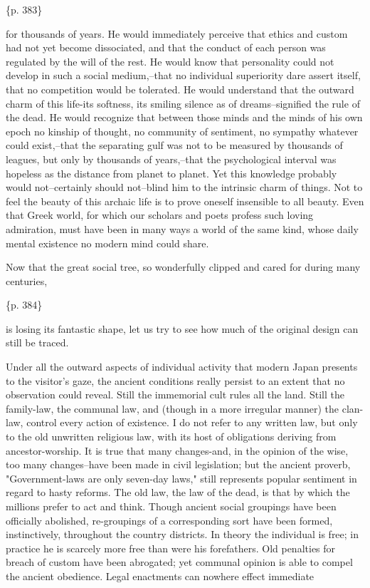 \{p. 383\}

for thousands of years. He would immediately perceive that ethics and custom had not yet become dissociated, and that the conduct of each person was regulated by the will of the rest. He would know that personality could not develop in such a social medium,--that no individual superiority dare assert itself, that no competition would be tolerated. He would understand that the outward charm of this life-its softness, its smiling silence as of dreams--signified the rule of the dead. He would recognize that between those minds and the minds of his own epoch no kinship of thought, no community of sentiment, no sympathy whatever could exist,--that the separating gulf was not to be measured by thousands of leagues, but only by thousands of years,--that the psychological interval was hopeless as the distance from planet to planet. Yet this knowledge probably would not--certainly should not--blind him to the intrinsic charm of things. Not to feel the beauty of this archaic life is to prove oneself insensible to all beauty. Even that Greek world, for which our scholars and poets profess such loving admiration, must have been in many ways a world of the same kind, whose daily mental existence no modern mind could share.



Now that the great social tree, so wonderfully clipped and cared for during many centuries,

\{p. 384\}

is losing its fantastic shape, let us try to see how much of the original design can still be traced.

Under all the outward aspects of individual activity that modern Japan presents to the visitor's gaze, the ancient conditions really persist to an extent that no observation could reveal. Still the immemorial cult rules all the land. Still the family-law, the communal law, and (though in a more irregular manner) the clan-law, control every action of existence. I do not refer to any written law, but only to the old unwritten religious law, with its host of obligations deriving from ancestor-worship. It is true that many changes-and, in the opinion of the wise, too many changes--have been made in civil legislation; but the ancient proverb, "Government-laws are only seven-day laws," still represents popular sentiment in regard to hasty reforms. The old law, the law of the dead, is that by which the millions prefer to act and think. Though ancient social groupings have been officially abolished, re-groupings of a corresponding sort have been formed, instinctively, throughout the country districts. In theory the individual is free; in practice he is scarcely more free than were his forefathers. Old penalties for breach of custom have been abrogated; yet communal opinion is able to compel the ancient obedience. Legal enactments can nowhere effect immediate

